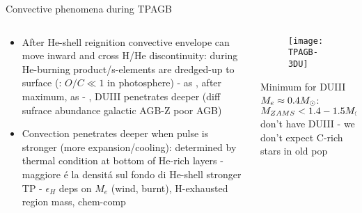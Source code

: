 \begin{frame}{Convective phenomena during TPAGB}
\begin{columns}[T]
\begin{column}{0.55\textwidth}
\begin{itemize}
\item After He-shell reignition convective envelope can move inward and cross H/He discontinuity: during  He-burning product/s-elements are dredged-up to surface (: $O/C\ll1$ in photosphere) -  as , after maximum,  as  - , DUIII penetrates deeper (diff sufrace abundance galactic AGB-Z poor AGB)
\item Convection penetrates deeper when pulse is stronger (more expansion/cooling): determined by thermal condition at bottom of He-rich layers -  maggiore \'e la densit\'a sul fondo di He-shell stronger TP - $\epsilon_H$ deps on $M_e$ (wind, burnt), H-exhausted region mass, chem-comp
\end{itemize}
\end{column}
\begin{column}{0.45\textwidth}
\begin{figure}[!ht]
\texttt{[image: TPAGB-3DU]}\label{fig:TPAGB-3DU}
\end{figure}
Minimum for DUIII $M_e\approx0.4M_{\odot}$: $M_{ZAMS}<1.4-1.5M_{\odot}$ don't have DUIII - we don't expect C-rich stars in old pop
\end{column}\end{columns}
\end{frame}

